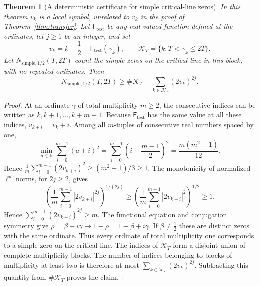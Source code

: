 \documentclass[11pt,a4paper]{article}
\makeatletter
\numberwithin{equation}{section}
\DeclareRobustCommand{\CGref}[1]{\ref{#1}}
\let\CG@origref\ref
\newcommand{\CG@gettip}[1]{\@ifundefined{CGTip@#1}{#1}{\csname CGTip@#1\endcsname}}
\DeclareRobustCommand{\CGref}[1]{\pdftooltip{\CG@origref{#1}}{\CG@gettip{#1}}}
\newtheorem{theorem}{Theorem}[section]
\theoremstyle{definition}
\theoremstyle{remark}
\makeatother
\begin{document}
\begin{theorem}[A deterministic certificate for simple critical-line zeros]\label{thm:recovered_simple_certificate}
In this theorem $v_k$ is a local symbol, unrelated to $v_k$ in the proof of Theorem~\CGref{thm:transfer}. Let $\mathsf F_{\mathrm{test}}$ be any real-valued function defined at the ordinates,
let $j\ge1$ be an integer, and set
\begin{equation}
v_k=k-\frac12-\mathsf F_{\mathrm{test}}(\gamma_k),\qquad
\mathcal K_T=\{k:T<\gamma_k\le2T\}.
\label{eq:disp_46}
\end{equation}
Let $N_{\mathrm{simple},1/2}(T,2T)$ count the simple zeros on the
critical line in this block, with no repeated ordinates. Then
\begin{equation}
N_{\mathrm{simple},1/2}(T,2T)
\ge\#\mathcal K_T-\sum_{k\in\mathcal K_T}(2v_k)^{2j}.
\label{eq:recovered_simple_certificate}
\end{equation}
\end{theorem}
\begin{proof}
At an ordinate $\gamma$ of total multiplicity $m\ge2$, the consecutive
indices can be written as $k,k+1,\ldots,k+m-1$. Because $\mathsf F_{\mathrm{test}}$ has the
same value at all these indices, $v_{k+i}=v_k+i$.
Among all $m$-tuples of consecutive real numbers spaced by one,
\begin{equation}
\min_{a\in\mathbb R}\sum_{i=0}^{m-1}(a+i)^2
=\sum_{i=0}^{m-1}\left(i-\frac{m-1}{2}\right)^2
=\frac{m(m^2-1)}{12}.
\label{eq:disp_47}
\end{equation}
Hence
$\frac1m\sum_{i=0}^{m-1}(2v_{k+i})^2\ge(m^2-1)/3\ge1$.
The monotonicity of normalized $\ell^p$ norms, for $2j\ge2$, gives
\begin{equation}
\left(\frac1m\sum_{i=0}^{m-1}|2v_{k+i}|^{2j}\right)^{1/(2j)}
\ge\left(\frac1m\sum_{i=0}^{m-1}|2v_{k+i}|^2\right)^{1/2}\ge1.
\label{eq:disp_48}
\end{equation}
Hence $\sum_{i=0}^{m-1}(2v_{k+i})^{2j}\ge m$.
The functional equation and conjugation symmetry give
$\rho=\beta+i\gamma\mapsto1-\overline\rho=1-\beta+i\gamma$.
If $\beta\ne\frac12$ these are distinct zeros with the same ordinate.
Thus every ordinate of total multiplicity one corresponds to a simple
zero on the critical line.
The indices of $\mathcal K_T$ form a disjoint union of complete
multiplicity blocks. The number of indices belonging to blocks of
multiplicity at least two is therefore at most
$\sum_{k\in\mathcal K_T}(2v_k)^{2j}$.
Subtracting this quantity from $\#\mathcal K_T$ proves the claim.
\end{proof}
\end{document}

